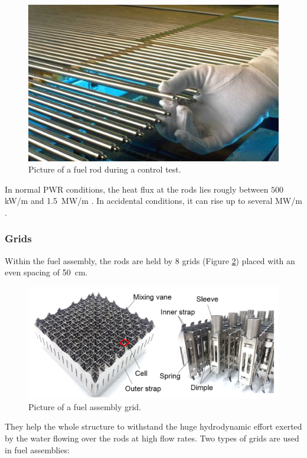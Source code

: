 \begin{figure}[!h]
\centering
\includegraphics[width=0.6\linewidth]{img/intro/fuel_rod.jpg}
\caption{Picture of a fuel rod during a control test. \cite{kamin_cycle_2019}}
\label{fig:fuel_rod}
\end{figure}

\npar

\begin{note*}{}
In normal PWR conditions, the heat flux at the rods lies rougly between $500~$kW/m and 1.5~MW/m \cite{pujet_memento_2016}. In accidental conditions, it can rise up to several MW/m \cite{manon_contribution_2000}.
\end{note*}
 
\subsubsection{Grids}

Within the fuel assembly, the rods are held by 8 grids (Figure \ref{fig:fuel_grid}) placed with an even spacing of 50\ cm. 

\begin{figure}[!h]
\centering
\includegraphics[width=0.8\linewidth]{img/intro/pic_grid.png}
\caption{Picture of a fuel assembly grid. \cite{yoo_finite_2019}}
\label{fig:fuel_grid}
\end{figure}

\npar


They help the whole structure to withstand the huge hydrodynamic effort exerted by the water flowing over the rods
at high flow rates. Two types of grids are used in fuel assemblies:

